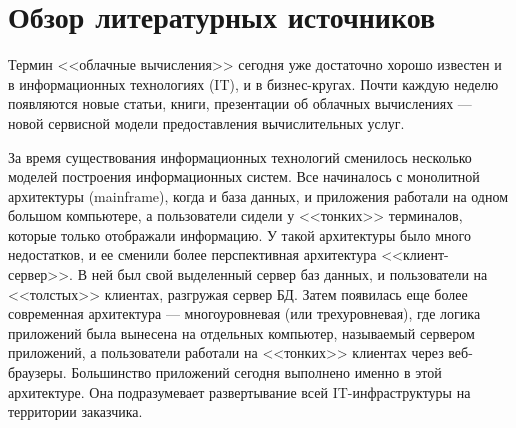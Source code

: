 \section{Обзор литературных источников}

\iffalse
Что я рассказал во введении:
\begin{itemize}
  \item что такое облачные услуги
  \item что такое iaas
  \item для чего нужна виртуализация
\end{itemize}

Примерно на 15-20 страниц.
\begin{itemize}
  \item облака + 
  \item ДЦ, типы для чего нужны tier iii + 
  \item виртуализация
  \item виды виртуализации
  \item контейнерная виртуализация
  \item представители openvz, virtuozzo, docker, lxc, Linux-VServer, solaris zones, jails, 
  \item использование
  \item перспективы в виртуализации
\end{itemize}
\fi

Термин <<облачные вычисления>> сегодня уже достаточно хорошо известен и в информационных технологиях (IT), и в бизнес-кругах.
Почти каждую неделю появляются новые статьи, книги, презентации об облачных вычислениях --- новой сервисной модели предоставления вычислительных услуг.

За время существования информационных технологий сменилось несколько моделей построения информационных систем.
Все начиналось с монолитной архитектуры (mainframe), когда и база данных, и приложения работали на одном большом компьютере, а пользователи сидели у <<тонких>> терминалов, которые только отображали информацию.
У такой архитектуры было много недостатков, и ее сменили более перспективная архитектура <<клиент-сервер>>.
В ней был свой выделенный сервер баз данных, и пользователи на <<толстых>> клиентах, разгружая сервер БД.
Затем появилась еще более современная архитектура --- многоуровневая (или трехуровневая), где логика приложений была вынесена на отдельных компьютер, называемый сервером приложений, а пользователи работали на <<тонких>> клиентах через веб-браузеры.
Большинство приложений сегодня выполнено именно в этой архитектуре.
Она подразумевает развертывание всей IT-инфраструктуры на территории заказчика. \cite{oracle-db}

